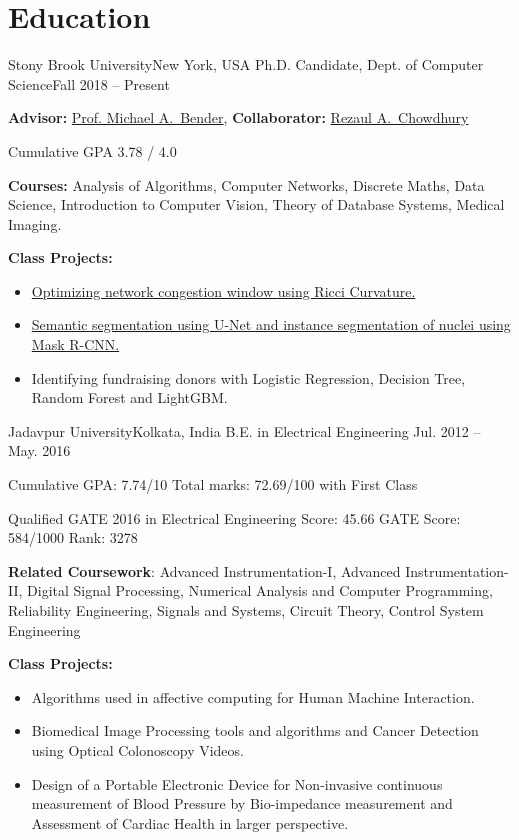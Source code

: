 \documentclass[letterpaper,10pt]{article}
\begin{document}
\section*{Education}
\resumeSubHeadingListStart
\resumeSubheading
{Stony Brook University}{New York, USA}
{Ph.D. Candidate, Dept. of Computer Science}{Fall 2018 -- Present}
\resumeItemListStart
\item \textbf{Advisor:} \href{https://www3.cs.stonybrook.edu/~bender/}{Prof. Michael A.\ Bender}, \textbf{Collaborator:} \href{https://www3.cs.stonybrook.edu/~rezaul/}{Rezaul A.\ Chowdhury}
\item Cumulative GPA 3.78 / 4.0
\item \textbf{Courses:} Analysis of Algorithms, Computer Networks, Discrete Maths, Data Science, Introduction to Computer Vision, Theory of Database Systems, Medical Imaging.
\item \textbf{Class Projects:} 
\begin{itemize}
    \item \href{https://github.com/ArghyaB118/network_curvature/blob/master/Text/project_534.pdf}{Optimizing network congestion window using Ricci Curvature.}
    \item \href{https://github.com/ArghyaB118/Image_Segmentation/blob/main/Project_CSE527/Final_Report.pdf}{Semantic segmentation using U-Net and instance segmentation of nuclei using Mask R-CNN.}
    \item {Identifying fundraising donors with Logistic Regression, Decision Tree, Random Forest and LightGBM.}
\end{itemize}
\resumeItemListEnd
\resumeSubheading
{Jadavpur University}{Kolkata, India}
{B.E. in Electrical Engineering }{Jul. 2012 -- May. 2016}
\resumeItemListStart
\item {Cumulative GPA: 7.74/10 Total marks: 72.69/100 with First Class}
\item {Qualified GATE 2016 in Electrical Engineering Score: 45.66 GATE Score: 584/1000 Rank: 3278}
\item {\textbf{Related Coursework}: Advanced Instrumentation-I, Advanced Instrumentation-II, Digital Signal Processing, Numerical Analysis and Computer Programming, Reliability Engineering, Signals and Systems, Circuit Theory, Control System Engineering}
\item \textbf{Class Projects:} 
\begin{itemize}
    \item {Algorithms used in affective computing for Human Machine Interaction.}
    \item {Biomedical Image Processing tools and algorithms and Cancer Detection using Optical Colonoscopy Videos.}
    \item {Design of a Portable Electronic Device for Non-invasive continuous measurement of Blood Pressure by Bio-impedance measurement and Assessment of Cardiac Health in larger perspective.}
\end{itemize}
\resumeItemListEnd
\resumeSubHeadingListEnd 
\end{document}
